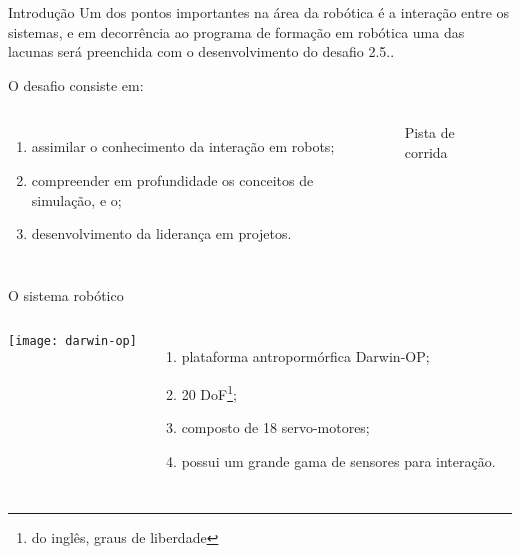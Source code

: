 \begin{frame}[t]{Introdução} 
    \transdissolve[duration=0.5]
    Um dos pontos importantes na área da robótica é a interação entre os sistemas, e em decorrência ao programa de formação em robótica uma das lacunas será preenchida com o desenvolvimento do desafio 2.5..

    O desafio consiste em:
        \begin{columns}[t]
                \begin{enumerate}
                    \item assimilar o conhecimento da interação em robots;
                    \item compreender em profundidade os conceitos de simulação, e o;
                    \item desenvolvimento da liderança em projetos.
                \end{enumerate}
            \begin{center}
                \begin{figure}
                    \caption{Pista de corrida \cite{agostini2007}}
                \end{figure}
            \end{center}
        \end{columns}
\end{frame}
\begin{frame}[t]{O sistema robótico}
    \transboxout[duration=0.5]
    \begin{columns}
            \texttt{[image: darwin-op]}
            \begin{enumerate}
                \item plataforma antropormórfica Darwin-OP;
                \item 20 DoF\footnote{do inglês, graus de liberdade};
                \item composto de 18 servo-motores;
                \item possui um grande gama de sensores para interação.
            \end{enumerate}
    \end{columns}
\end{frame}
